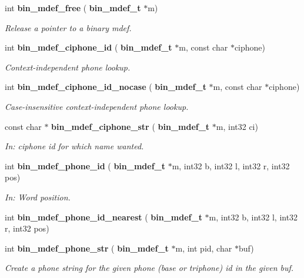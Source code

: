 \begin{DoxyCompactItemize}
\mbox{\label{bin__mdef_8h_afe7ed87e2a2d22b228c14ed8225e4b2c}} 
int \textbf{ bin\+\_\+mdef\+\_\+free} (\textbf{ bin\+\_\+mdef\+\_\+t} $\ast$m)
\begin{DoxyCompactList}\small\item\em Release a pointer to a binary mdef. \end{DoxyCompactList}\item 
int \textbf{ bin\+\_\+mdef\+\_\+ciphone\+\_\+id} (\textbf{ bin\+\_\+mdef\+\_\+t} $\ast$m, const char $\ast$ciphone)
\begin{DoxyCompactList}\small\item\em Context-\/independent phone lookup. \end{DoxyCompactList}\item 
int \textbf{ bin\+\_\+mdef\+\_\+ciphone\+\_\+id\+\_\+nocase} (\textbf{ bin\+\_\+mdef\+\_\+t} $\ast$m, const char $\ast$ciphone)
\begin{DoxyCompactList}\small\item\em Case-\/insensitive context-\/independent phone lookup. \end{DoxyCompactList}\item 
const char $\ast$ \textbf{ bin\+\_\+mdef\+\_\+ciphone\+\_\+str} (\textbf{ bin\+\_\+mdef\+\_\+t} $\ast$m, int32 ci)
\begin{DoxyCompactList}\small\item\em In\+: ciphone id for which name wanted. \end{DoxyCompactList}\item 
int \textbf{ bin\+\_\+mdef\+\_\+phone\+\_\+id} (\textbf{ bin\+\_\+mdef\+\_\+t} $\ast$m, int32 b, int32 l, int32 r, int32 pos)
\begin{DoxyCompactList}\small\item\em In\+: Word position. \end{DoxyCompactList}\item 
\mbox{\label{bin__mdef_8h_a155bcd77cd4cd26d15c857b999a1fdae}} 
int {\bfseries bin\+\_\+mdef\+\_\+phone\+\_\+id\+\_\+nearest} (\textbf{ bin\+\_\+mdef\+\_\+t} $\ast$m, int32 b, int32 l, int32 r, int32 pos)
\item 
int \textbf{ bin\+\_\+mdef\+\_\+phone\+\_\+str} (\textbf{ bin\+\_\+mdef\+\_\+t} $\ast$m, int pid, char $\ast$buf)
\begin{DoxyCompactList}\small\item\em Create a phone string for the given phone (base or triphone) id in the given buf. \end{DoxyCompactList}\end{DoxyCompactItemize}
